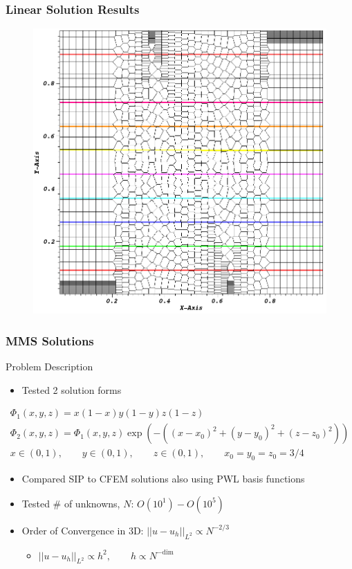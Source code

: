 \documentclass[]{beamer}
\begin{document}
\begin{frame}[t]\frametitle{Linear Solution Results}
	\begin{figure}[t]
		\centering
		\includegraphics[width=.5\textwidth]{images/z_poly_lin_contour.png}
	\end{figure}
\end{frame}
\begin{frame}[t]\frametitle{MMS Solutions}
    	\begin{block}{Problem Description}{\small
		\begin{itemize}
			\item Tested 2 solution forms
		\end{itemize}
		\begin{gather*}
			 \Phi_1 (x,y,z) = x(1-x) y (1-y) z (1-z) \\
			 \Phi_2 (x,y,z) = \Phi_1 (x,y,z) \exp(-\left(  (x-x_0)^2 + (y-y_0)^2 + (z-z_0)^2 \right)) \\ 
			x\in (0,1), \qquad y\in (0,1), \qquad z\in (0,1), \qquad  x_0=y_0=z_0=3/4
        	\end{gather*}
		\begin{itemize}
			\item Compared SIP to CFEM solutions also using PWL basis functions
			\item Tested \# of unknowns, $N$: $ O( 10^1) - O(10^5)$
			\item Order of Convergence in 3D: $|| u - u_h ||_{L^2} \propto N^{-2/3}$
			\begin{itemize}
				\item $|| u - u_h ||_{L^2} \propto h^2, \qquad h \propto N^{- \text{dim}}$
			\end{itemize}
		\end{itemize}}
	\end{block}
\end{frame}
\end{document}
